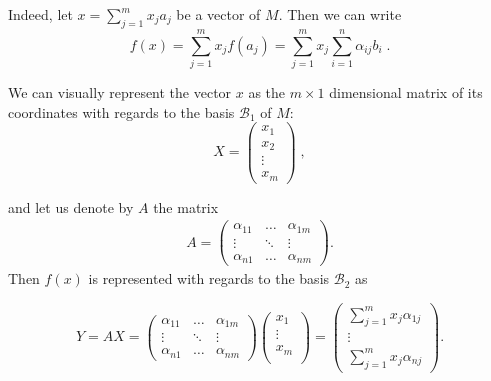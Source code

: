 \documentclass{report}
\theoremstyle{definition}
\theoremstyle{remark}
\begin{document}
Indeed, let $x = \sum_{j = 1}^m x_j a_j$ be a vector of $M$. Then we can write 
\begin{equation*}
    f(x) = \sum_{j = 1}^m x_j f(a_j) =  \sum_{j=1}^m x_j \sum_{i=1}^n \alpha_{ij}b_i\;. 
\end{equation*}

We can visually represent the vector $x$ as the $m \times 1$ dimensional matrix of its coordinates with regards to the basis $\mathcal{B}_1$ of $M$:
\begin{equation*}
    X=\begin{pmatrix}
    x_1 \\
    x_2 \\
    \vdots \\
    x_m
    \end{pmatrix}\;,
\end{equation*}


and let us denote by $A$ the matrix \begin{equation*}
    \begin{split}
        A = 
        \begin{pmatrix}
            \alpha_{11} & \dots & \alpha_{1m} \\
            \vdots & \ddots & \vdots \\
            \alpha_{n1} & \dots & \alpha_{nm}
         \end{pmatrix}.
    \end{split}
\end{equation*}
Then $f(x)$ is represented with regards to the basis $\mathcal{B}_2$ as 

\begin{equation*}
   Y= AX = \begin{pmatrix}
    \alpha_{11} & \dots & \alpha_{1m} \\
    \vdots & \ddots & \vdots \\
    \alpha_{n1} & \dots & \alpha_{nm}
    \end{pmatrix}
    \begin{pmatrix}
        x_1 \\
        \vdots \\
        x_m \\
    \end{pmatrix}
    =
    \begin{pmatrix}
    \sum_{j=1}^m  x_j \alpha_{1j} \\
    \vdots \\
    \sum_{j=1}^m  x_j \alpha_{nj} 
    \end{pmatrix}.
\end{equation*} 
\end{document}
